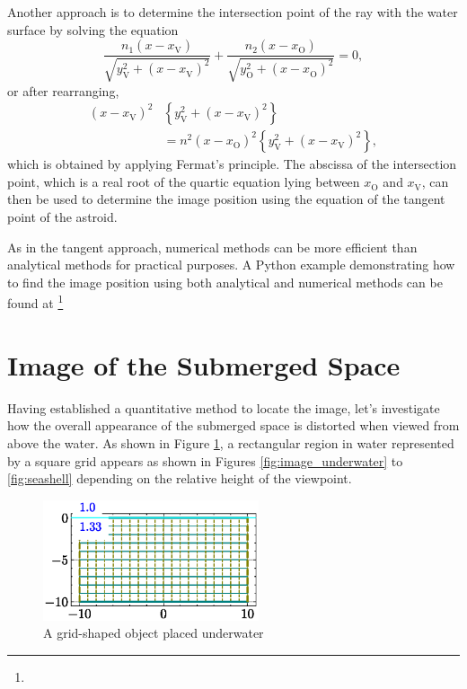 \documentclass[twocolumn]{article}
\begin{document}
Another approach is to determine the intersection point of the ray with the water surface by solving the equation
\[
\dfrac{n_1 \left( x - x_{\mathrm{V}}^{} \right)}{\sqrt{ y_{\mathrm{V}}^2 + \left( x - x_{\mathrm{V}}^{} \right)^2 }}
+\dfrac{n_2 \left( x - x_{\mathrm{O}}^{} \right)}{\sqrt{ y_{\mathrm{O}}^2 + \left( x - x_{\mathrm{O}}^{} \right)^2 }}
= 0,
\]
or after rearranging,
\[ \begin{aligned}
	\left( x - x_{\mathrm{V}}^{} \right)^2 &\left\{ y_{\mathrm{V}}^2 + \left(x - x_{\mathrm{V}}^{} \right)^2 \right\} \\
	&= n^2 \left( x - x_{\mathrm{O}}^{} \right)^2 \left\{ y_{\mathrm{V}}^2 + \left(x - x_{\mathrm{V}}^{} \right)^2 \right\},
\end{aligned}
\]
which is obtained by applying Fermat's principle. The abscissa of the intersection point, which is a real root of the quartic equation
lying between $x_{\mathrm{O}}^{}$ and $x_{\mathrm{V}}^{}$, can then be used to determine the image position using the equation of the tangent point of the astroid.

As in the tangent approach, numerical methods can be more efficient than analytical methods for practical purposes. A Python example demonstrating how to find the image position using both analytical and numerical methods can be found at 
\href{https://github.com/mingshey/python_projects/blob/main/Refraction_Image.ipynb}%
{}\footnote{}

\section{Image of the Submerged Space}

Having established a quantitative method to locate the image, let's investigate how the overall appearance of the submerged space is distorted when viewed from above the water. As shown in Figure \ref{fig:grid_underwater}, a rectangular region in water represented by a square grid appears as shown in Figures \ref{fig:image_underwater} to \ref{fig:seashell} depending on the relative height of the viewpoint.

\begin{figure}
	\centering
	\includegraphics[width=2.5in]{figs/grid_underwater.eps}
	\caption{A grid-shaped object placed underwater}
	\label{fig:grid_underwater}
\end{figure}
\end{document}

